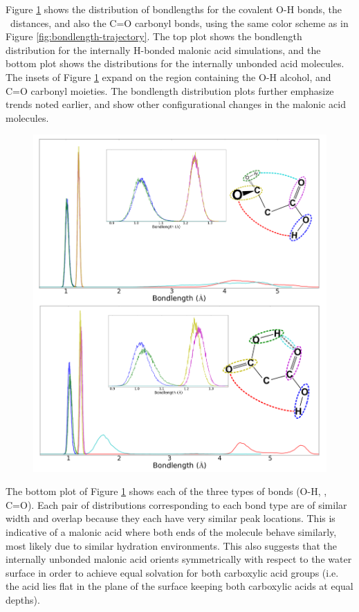 Figure \ref{fig:bondlength-distribution} shows the distribution of bondlengths for the covalent O-H bonds, the \ocarb~distances, and also the C=O carbonyl bonds, using the same color scheme as in Figure \ref{fig:bondlength-trajectory}. The top plot shows the bondlength distribution for the internally H-bonded malonic acid simulations, and the bottom plot shows the distributions for the internally unbonded acid molecules. The insets of Figure \ref{fig:bondlength-distribution} expand on the region containing the O-H alcohol, and C=O carbonyl moieties. The bondlength distribution plots further emphasize trends noted earlier, and show other configurational changes in the malonic acid molecules.

\begin{figure}[h!]
	\begin{center}
		\includegraphics[scale=1.0]{images/bond-length/BondLengthDistros.png}
		\caption{}
		\label{fig:bondlength-distribution}
	\end{center}
\end{figure}

The bottom plot of Figure \ref{fig:bondlength-distribution} shows each of the three types of bonds (O-H, \ocarb, C=O). Each pair of distributions corresponding to each bond type are of similar width and overlap because they each have very similar peak locations. This is indicative of a malonic acid where both ends of the molecule behave similarly, most likely due to similar hydration environments. This also suggests that the internally unbonded malonic acid orients symmetrically with respect to the water surface in order to achieve equal solvation for both carboxylic acid groups (i.e. the acid lies flat in the plane of the surface keeping both carboxylic acids at equal depths). 

